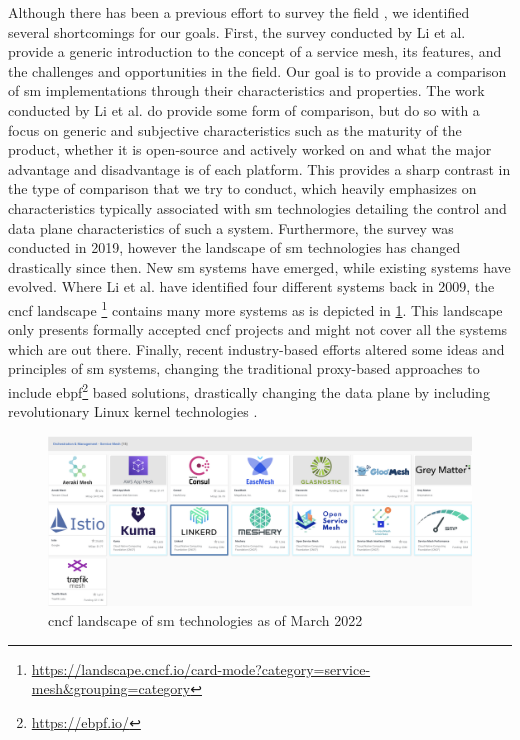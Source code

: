 Although there has been a previous effort to survey the field \cite{service-mesh-survey}, we identified several shortcomings for our goals. First, the survey conducted by Li et al. provide a generic introduction to the concept of a service mesh, its features, and the challenges and opportunities in the field. Our goal is to provide a comparison of \gls{sm} implementations through their characteristics and properties. The work conducted by Li et al. do provide some form of comparison, but do so with a focus on generic and subjective characteristics such as the maturity of the product, whether it is open-source and actively worked on and what the major advantage and disadvantage is of each platform. This provides a sharp contrast in the type of comparison that we try to conduct, which heavily emphasizes on characteristics typically associated with  \gls{sm} technologies detailing the control and data plane characteristics of such a system. Furthermore, the survey was conducted in 2019, however the landscape of \gls{sm} technologies has changed drastically since then. New \gls{sm} systems have emerged, while existing systems have evolved. Where Li et al. \cite{service-mesh-survey} have identified four different systems back in 2009, the \gls{cncf} landscape \cite{cncf-landscape}\footnote{\url{https://landscape.cncf.io/card-mode?category=service-mesh&grouping=category}} contains many more systems as is depicted in \cref{fig:cncf-landscape-sm}. This landscape only presents formally accepted \gls{cncf} projects and might not cover all the systems which are out there. Finally, recent industry-based efforts altered some ideas and principles of \gls{sm} systems, changing the traditional proxy-based approaches to include  \gls{ebpf}\footnote{\url{https://ebpf.io/}} based solutions, drastically changing the data plane by including revolutionary Linux kernel technologies \cite{istio-merbridge, cilium-ebpf-mesh}.


\begin{figure}[t]
    \centering
    \includegraphics[width=0.9\linewidth]{3_systems_survey/figures/cncf-landscape-service-mesh}
    \caption{\gls{cncf} landscape of \gls{sm} technologies as of March 2022}
    \label{fig:cncf-landscape-sm}
\end{figure}

